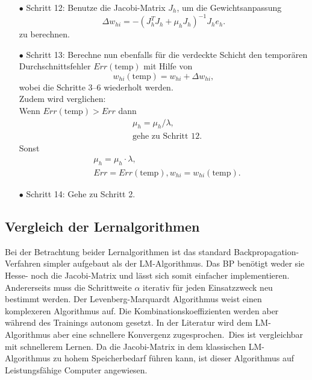 \begin{itemize}
\item[\textbf{$\bullet$}] Schritt 12: Benutze die Jacobi-Matrix $J_{h}$, um die Gewichtsanpassung 
\begin{equation}
\Delta w_{hi}=-(J_{h}^T J_{h} + \mu_{h} J_{h})^{-1} J_{h} e_{h}.
\end{equation}
zu berechnen.

\item[\textbf{$\bullet$}] Schritt 13: Berechne nun ebenfalls für die verdeckte Schicht den temporären Durchschnittsfehler $Err(\text{temp})$ mit Hilfe von
\begin{equation}
w_{hi}(\text{temp})= w_{hi} + \Delta w_{hi},
\end{equation}
wobei die Schritte 3--6 wiederholt werden.\\
Zudem wird verglichen:\\
Wenn $Err(\text{temp}) > Err$ dann
\begin{align*}
&\mu_h = \mu_h / \lambda, \\
&\text{gehe zu Schritt 12.}
\end{align*}
Sonst
\begin{align*}
&\mu_h = \mu_h \cdot \lambda, \\
&Err=Err(\text{temp}), w_{hi}=w_{hi}(\text{temp}).
\end{align*}

\item[\textbf{$\bullet$}] Schritt 14: Gehe zu Schritt 2.
\end{itemize}

\subsection{Vergleich der Lernalgorithmen}

Bei der Betrachtung beider Lernalgorithmen ist das standard Backpropagation-Verfahren simpler aufgebaut als der LM-Algorithmus. Das BP benötigt weder sie Hesse- noch die Jacobi-Matrix und lässt sich somit einfacher implementieren. Andererseits muss die Schrittweite $\alpha$ iterativ für jeden Einsatzzweck neu bestimmt werden. Der Levenberg-Marquardt Algorithmus weist einen komplexeren Algorithmus auf. Die Kombinationskoeffizienten werden aber während des Trainings autonom gesetzt. In der Literatur wird dem LM-Algorithmus aber eine schnellere Konvergenz zugesprochen.\, Dies ist vergleichbar mit schnellerem Lernen. Da die Jacobi-Matrix in dem klassischen LM-Algorithmus zu hohem Speicherbedarf führen kann, ist dieser Algorithmus auf Leistungsfähige Computer angewiesen. 

